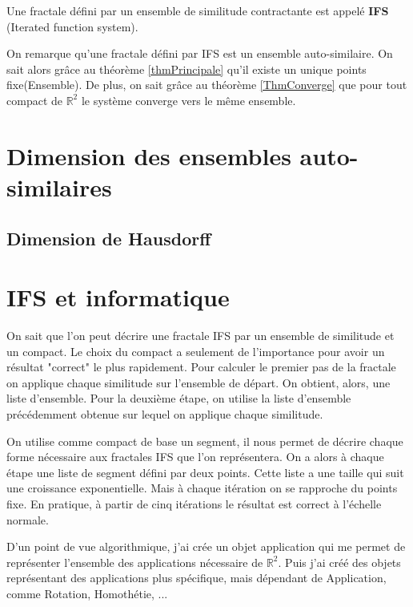 \documentclass[a4paper, 12pt]{report}
\begin{document}
			\begin{definition}
				Une fractale défini par un ensemble de similitude contractante est appelé \textbf{IFS} (Iterated function system). 
			\end{definition}
			
			On remarque qu'une fractale défini par IFS est un ensemble auto-similaire. On sait alors grâce au théorème \ref{thmPrincipale} qu'il existe un unique points fixe(Ensemble). De plus, on sait grâce au théorème \ref{ThmConverge} que pour tout compact de $\mathds{R}^2$ le système converge vers le même ensemble.

	\chapter{\bf Dimension des ensembles auto-similaires}
		\section{Dimension de Hausdorff}
	
	\chapter{IFS et informatique}
			
			On sait que l'on peut décrire une fractale IFS par un ensemble de similitude et un compact. Le choix du compact a seulement de l'importance pour avoir un résultat "correct" le plus rapidement. Pour calculer le premier pas de la fractale on applique chaque similitude sur l'ensemble de départ. On obtient, alors, une liste d'ensemble. Pour la deuxième étape, on utilise la liste d'ensemble précédemment obtenue sur lequel on applique chaque similitude.
			
			
			On utilise comme compact de base un segment, il nous permet de décrire chaque forme nécessaire aux fractales IFS que l'on représentera. On a alors à chaque étape une liste de segment défini par deux points. Cette liste a une taille qui suit une croissance exponentielle. Mais à chaque itération on se rapproche du points fixe. En pratique, à partir de cinq itérations le résultat est correct à l'échelle normale.
			
			
			D'un point de vue algorithmique, j'ai crée un objet application qui me permet de représenter l'ensemble des applications nécessaire de $\mathds{R}^2$. Puis j'ai créé des objets représentant des applications plus spécifique, mais dépendant de Application, comme Rotation, Homothétie, ...
			
\end{document}
